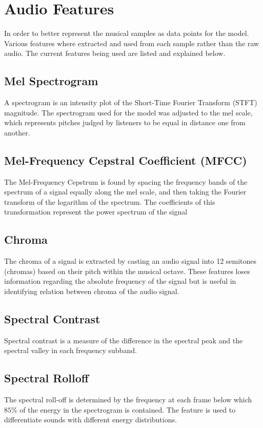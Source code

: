 \documentclass{article}
\begin{document}
\section{Audio Features}
\label{features}

In order to better represent the musical samples as data points for the model. Various features where extracted and used from each sample rather than the raw audio. The current features being used are listed and explained below.

\subsection{Mel Spectrogram}
A spectrogram is an intensity plot of the Short-Time Fourier Transform (STFT) magnitude. The spectrogram used for the model was adjusted to the mel scale, which represents pitches judged by listeners to be equal in distance one from another.

\subsection{Mel-Frequency Cepstral Coefficient (MFCC)}
The Mel-Frequency Cepstrum is found by spacing the frequency bands of the spectrum of a signal equally along the mel scale, and then taking the Fourier transform of the logarithm of the spectrum. The coefficients of this transformation represent the power spectrum of the signal

\subsection{Chroma}
The chroma of a signal is extracted by casting an audio signal into 12 semitones (chromas) based on their pitch within the musical octave. 
These features loses information regarding the absolute frequency of the signal but is useful in identifying relation between chroma of the audio signal.

\subsection{Spectral Contrast}
Spectral contrast is a measure of the difference in the spectral peak and the spectral valley in each frequency subband.

\subsection{Spectral Rolloff}
The spectral roll-off is determined by the frequency at each frame below which ${85}\%$  of the energy in the spectrogram is contained. The feature is used to differentiate sounds with different energy distributions. 
\end{document}
